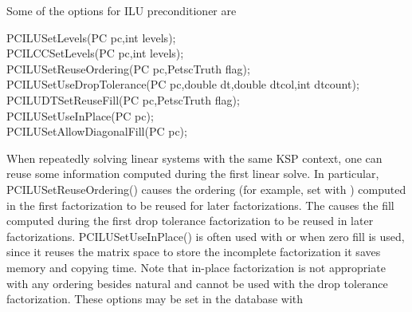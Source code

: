 Some of the options for ILU preconditioner are 
\begin{tabbing}
  PCILUSetLevels(PC pc,int levels);\\
  PCILCCSetLevels(PC pc,int levels);\\
  PCILUSetReuseOrdering(PC pc,PetscTruth flag);\\
  PCILUSetUseDropTolerance(PC pc,double dt,double dtcol,int dtcount);\\
  PCILUDTSetReuseFill(PC pc,PetscTruth flag);\\
  PCILUSetUseInPlace(PC pc); \\
  PCILUSetAllowDiagonalFill(PC pc);
\end{tabbing}
 
 
 

When repeatedly solving linear systems with the same KSP
context, one can reuse some information  computed
during the first linear solve.
In particular, PCILUSetReuseOrdering() causes the ordering  (for example, set with 
 ) computed in the first factorization to be reused
for later factorizations.  
The  causes the 
fill computed during the first drop tolerance factorization to be reused
in later factorizations. PCILUSetUseInPlace() is often used with 
 or  when zero fill is used, since it reuses the 
matrix space to store the incomplete factorization it saves memory and 
copying time. Note that in-place factorization is not appropriate with 
any ordering besides natural and cannot be used with the drop tolerance
factorization. These options may be set in the database with 
\begin{tabbing}
   \\
   \\
   \\
   \\
   \\
   \\
\end{tabbing}
 
 
 

